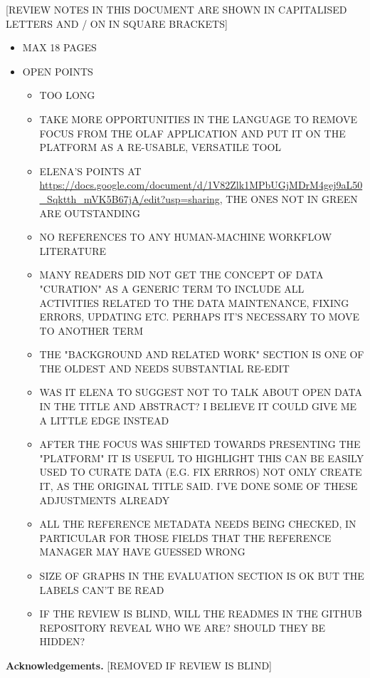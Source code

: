 \documentclass{llncs}
\begin{document}
[REVIEW NOTES IN THIS DOCUMENT ARE SHOWN IN CAPITALISED LETTERS AND / ON IN SQUARE BRACKETS] 
\begin{itemize}

    \item MAX 18 PAGES
    \item OPEN POINTS
        \begin{itemize}
            \item TOO LONG
            \item TAKE MORE OPPORTUNITIES IN THE LANGUAGE TO REMOVE FOCUS FROM THE OLAF APPLICATION AND PUT IT ON THE PLATFORM AS A RE-USABLE, VERSATILE TOOL
            \item ELENA'S POINTS AT \url{https://docs.google.com/document/d/1V82Zlk1MPbUGjMDrM4gej9aL50_Sqktth_mVK5B67jA/edit?usp=sharing}, THE ONES NOT IN GREEN ARE OUTSTANDING
            \item NO REFERENCES TO ANY HUMAN-MACHINE WORKFLOW LITERATURE
            \item MANY READERS DID NOT GET THE CONCEPT OF DATA "CURATION" AS A GENERIC TERM TO INCLUDE ALL ACTIVITIES RELATED TO THE DATA MAINTENANCE, FIXING ERRORS, UPDATING ETC.  PERHAPS IT'S NECESSARY TO MOVE TO ANOTHER TERM
            \item THE "BACKGROUND AND RELATED WORK" SECTION IS ONE OF THE OLDEST AND NEEDS SUBSTANTIAL RE-EDIT
            \item WAS IT ELENA TO SUGGEST NOT TO TALK ABOUT OPEN DATA IN THE TITLE AND ABSTRACT? I BELIEVE IT COULD GIVE ME A LITTLE EDGE INSTEAD
            \item AFTER THE FOCUS WAS SHIFTED TOWARDS PRESENTING THE "PLATFORM" IT IS USEFUL TO HIGHLIGHT THIS CAN BE EASILY USED TO CURATE DATA (E.G. FIX ERRROS) NOT ONLY CREATE IT, AS THE ORIGINAL TITLE SAID. I'VE DONE SOME OF THESE ADJUSTMENTS ALREADY
            \item ALL THE REFERENCE METADATA NEEDS BEING CHECKED, IN PARTICULAR FOR THOSE FIELDS THAT THE REFERENCE MANAGER MAY HAVE GUESSED WRONG
            \item SIZE OF GRAPHS IN THE EVALUATION SECTION IS OK BUT THE LABELS CAN'T BE READ
            \item IF THE REVIEW IS BLIND, WILL THE READMES IN THE GITHUB REPOSITORY REVEAL WHO WE ARE? SHOULD THEY BE HIDDEN?
        \end{itemize}
\end{itemize}









\textbf{Acknowledgements.} [REMOVED IF REVIEW IS BLIND]


\end{document}
